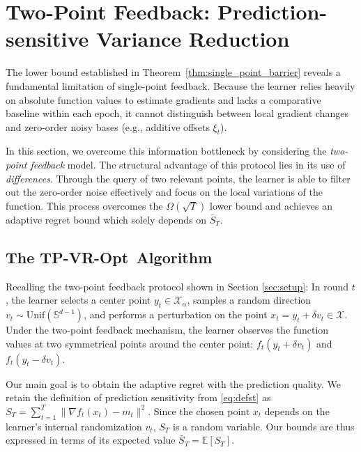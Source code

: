 \documentclass[journal,onecolumn]{IEEEtran}
\newcommand{\cX}{\mathcal{X}}
\theoremstyle{plain}
\theoremstyle{definition}
\theoremstyle{remark}
\newcommand{\tpvr}{{\sc TP-VR-Opt}}
\begin{document}
\section{Two-Point Feedback: Prediction-sensitive Variance Reduction}
\label{sec:twopoint_vr}

The lower bound established in Theorem~\ref{thm:single_point_barrier} reveals a fundamental limitation of single-point feedback. Because the learner relies heavily on absolute function values to estimate gradients and lacks a comparative baseline within each epoch, it cannot distinguish between local gradient changes and zero-order noisy bases (e.g., additive offsets $\xi_{t}$).

In this section, we overcome this information bottleneck by considering the
\emph{two-point feedback} model. The structural advantage of this protocol lies
in its use of \emph{differences}. Through the query of two relevant points, the learner
is able to filter out the zero-order noise effectively and focus on the local variations
of the function. This process overcomes the $\Omega(\sqrt{T})$ lower bound and achieves an adaptive regret bound which solely depends on $\bar S_{T}$.

\subsection{The \tpvr\, Algorithm}
\label{sec:tp-vr-alg}

Recalling the two-point feedback protocol shown in Section \ref{sec:setup}: In
round $t$, the learner selects a center point $y_{t}\in \cX_{\alpha}$, samples a
random direction $v_{t}\sim \mathrm{Unif}(\mathbb{S}^{d-1})$, and performs a perturbation
on the point $x_{t}=y_{t}+\delta v_{t}\in \cX$. Under the two-point feedback
mechanism, the learner observes the function values at two symmetrical points around
the center point: $f_{t}(y_{t}+\delta v_{t})$ and $f_{t}(y_{t}-\delta v_{t})$. %

Our main goal is to obtain the adaptive regret with the prediction quality. We
retain the definition of prediction sensitivity from \eqref{eq:defst} as
$S_{T} = \sum_{t=1}^{T}\|\nabla f_{t}(x_t)- m_{t}\|^{2}$. Since the chosen point $x_{t}$
depends on the learner's internal randomization $v_{t}$, $S_{T}$ is a random
variable. Our bounds are thus  expressed in terms of its expected value
 $\bar S_{T}= \mathbb{E}[S_{T}]$.
\end{document}

